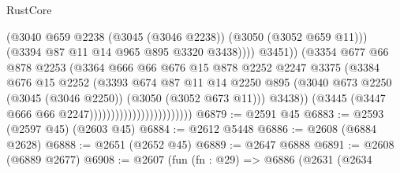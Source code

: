\begin{lexlean}{RustCore}
\begin{coremodule}
                                                      (@3040
                                                        @659
                                                        @2238
                                                        (@3045 (@3046 @2238))
                                                        (@3050 (@3052 @659 @11)))
                                                      (@3394 @87 @11 @14 @965 @895 @3320 @3438))))
                                                @3451))
                                            (@3354
                                              @677
                                              @66
                                              @878
                                              @2253
                                              (@3364
                                                @666
                                                @66
                                                @676
                                                @15
                                                @878
                                                @2252
                                                @2247
                                                @3375
                                                (@3384
                                                  @676
                                                  @15
                                                  @2252
                                                  (@3393
                                                    @674
                                                    @87
                                                    @11
                                                    @14
                                                    @2250
                                                    @895
                                                    (@3040
                                                      @673
                                                      @2250
                                                      (@3045 (@3046 @2250))
                                                      (@3050 (@3052 @673 @11)))
                                                    @3438))
                                                (@3445 (@3447 @666 @66 @2247))))))))))))))))))))))))
@6879 := @2591 @45
@6883 := @2593 (@2597 @45) (@2603 @45)
@6884 := @2612 @5448
@6886 := @2608 (@6884 @2628)
@6888 := @2651 (@2652 @45)
@6889 := @2647 @6888
@6891 := @2608 (@6889 @2677)
@6908 := @2607
    (fun (fn : @29) =>
    @6886
      (@2631
        (@2634

\end{coremodule}
\end{lexlean}
